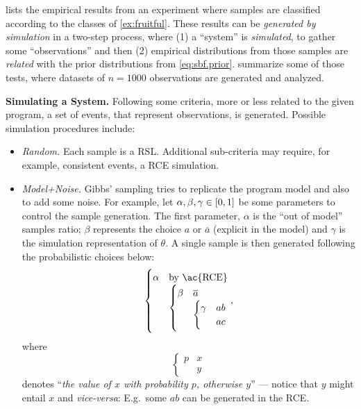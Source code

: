 \documentclass[a4paper]{article}
\renewcommand{\cite}{\citep}
\newcommand{\co}[1]{\ensuremath{\overline{#1}}}     %
\begin{document}
 lists the empirical results from an experiment 
where samples are classified according to 
the classes of \cref{ex:fruitful}.
These results can be \emph{generated by simulation} in a two-step
process, where (1) a ``system'' is \emph{simulated}, to gather some
``observations'' and then (2) empirical distributions from those
samples are \emph{related} with the prior distributions from
\cref{eq:sbf.prior}.  
summarize some of those tests, where datasets of \(n = 1000\)
observations are generated and analyzed.

\bigskip\noindent\textbf{Simulating a System.} Following some
criteria, more or less related to the given program, a set of events,
that represent observations, is generated.  Possible simulation
procedures include:
\begin{itemize}

\item \emph{Random.} Each sample is a \ac{RSL}.  Additional
  sub-criteria may require, for example, consistent events, a \ac{RCE}
  simulation.

\item \emph{Model+Noise.} Gibbs' sampling \cite{geman84} tries to
  replicate the program model and also to add some noise.  For
  example, let \(\alpha, \beta, \gamma \in \intcc{0,1}\) be some
  parameters to control the sample generation.  The first parameter,
  \(\alpha\) is the ``out of model'' samples ratio; \(\beta\)
  represents the choice \(a\) or \(\co{a}\) (explicit in the model)
  and \(\gamma\) is the simulation representation of \(\theta\).  A
  single sample is then generated following the probabilistic choices
  below:
          \[
              \begin{cases}
                  \alpha & \text{by \ac{RCE}} \\[0pt]
                         &
                  \begin{cases}
                      \beta & \co{a} \\[0pt]
                            &
                      \begin{cases}
                          \gamma & ab \\[0pt]
                                 & ac
                      \end{cases}
                  \end{cases}
              \end{cases},
          \]
          where \[
              \begin{cases}
                  p & x \\[-4pt]
                    & y\end{cases}
          \]
          denotes ``\emph{the value of \(x\) with probability \(p\),
            otherwise \(y\)}'' --- notice that \(y\) might entail
          \(x\) and \emph{vice-versa}: E.g.\ some \(ab\) can be
          generated in the \ac{RCE}.


\end{itemize}
\end{document}
